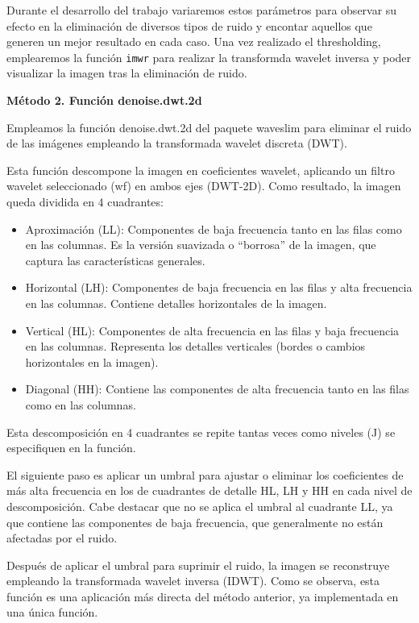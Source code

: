 \documentclass[
]{article}
\begin{document}
Durante el desarrollo del trabajo variaremos estos parámetros para
observar su efecto en la eliminación de diversos tipos de ruido y
encontar aquellos que generen un mejor resultado en cada caso. Una vez
realizado el thresholding, emplearemos la función \texttt{imwr} para
realizar la transformda wavelet inversa y poder visualizar la imagen
tras la eliminación de ruido.

\textbf{Método 2. Función denoise.dwt.2d}

Empleamos la función denoise.dwt.2d del paquete waveslim para eliminar
el ruido de las imágenes empleando la transformada wavelet discreta
(DWT).

Esta función descompone la imagen en coeficientes wavelet, aplicando un
filtro wavelet seleccionado (wf) en ambos ejes (DWT-2D). Como resultado,
la imagen queda dividida en 4 cuadrantes:

\begin{itemize}
\item
  Aproximación (LL): Componentes de baja frecuencia tanto en las filas
  como en las columnas. Es la versión suavizada o ``borrosa'' de la
  imagen, que captura las características generales.
\item
  Horizontal (LH): Componentes de baja frecuencia en las filas y alta
  frecuencia en las columnas. Contiene detalles horizontales de la
  imagen.
\item
  Vertical (HL): Componentes de alta frecuencia en las filas y baja
  frecuencia en las columnas. Representa los detalles verticales (bordes
  o cambios horizontales en la imagen).
\item
  Diagonal (HH): Contiene las componentes de alta frecuencia tanto en
  las filas como en las columnas.
\end{itemize}

Esta descomposición en 4 cuadrantes se repite tantas veces como niveles
(J) se especifiquen en la función.

El siguiente paso es aplicar un umbral para ajustar o eliminar los
coeficientes de más alta frecuencia en los de cuadrantes de detalle HL,
LH y HH en cada nivel de descomposición. Cabe destacar que no se aplica
el umbral al cuadrante LL, ya que contiene las componentes de baja
frecuencia, que generalmente no están afectadas por el ruido.

Después de aplicar el umbral para suprimir el ruido, la imagen se
reconstruye empleando la transformada wavelet inversa (IDWT). Como se
observa, esta función es una aplicación más directa del método anterior,
ya implementada en una única función.
\end{document}

